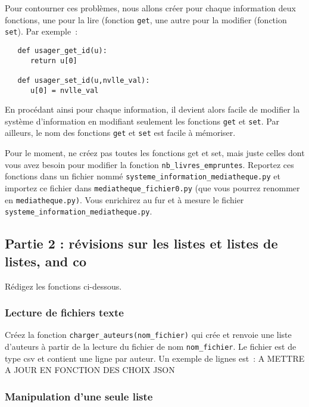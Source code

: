 \documentclass[10pt,a4paper,onecolumn]{article}
\begin{document}
Pour contourner ces problèmes, nous allons créer pour chaque information deux fonctions, une pour la lire (fonction \texttt{get}, une autre pour la modifier (fonction \texttt{set}). Par exemple~:

\begin{verbatim}
   def usager_get_id(u):
      return u[0]

   def usager_set_id(u,nvlle_val):
      u[0] = nvlle_val
\end{verbatim}

En procédant ainsi pour chaque information, il devient alors facile de modifier la système d'information en modifiant seulement les fonctions \texttt{get} et \texttt{set}. Par ailleurs, le nom des fonctions \texttt{get} et \texttt{set} est facile à mémoriser.

Pour le moment, ne créez pas toutes les fonctions get et set, mais juste celles dont vous avez besoin pour modifier la fonction \texttt{nb\_livres\_empruntes}. Reportez ces fonctions dans un fichier nommé \texttt{systeme\_information\_mediatheque.py} et importez ce fichier dans \texttt{mediatheque\_fichier0.py} (que vous pourrez renommer en \texttt{mediatheque.py)}. Vous enrichirez au fur et à mesure le fichier \texttt{systeme\_information\_mediatheque.py}.

\subsection{Partie 2 : révisions sur les listes et listes de listes, and co}

Rédigez les fonctions ci-dessous.


\subsubsection{Lecture de fichiers texte}

Créez la fonction \texttt{charger\_auteurs(nom\_fichier)} qui crée et renvoie une liste d'auteurs à partir de la lecture du fichier de nom \texttt{nom\_fichier}. Le fichier est de type csv et contient une ligne par auteur. Un exemple de lignes est~: A METTRE A JOUR EN FONCTION DES CHOIX JSON

\subsubsection{Manipulation d'une seule liste}
\end{document}
